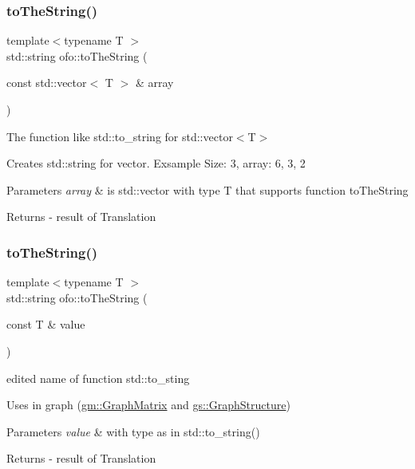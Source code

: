 \subsubsection{\texorpdfstring{to\+The\+String()}{toTheString()}\hspace{0.1cm}{\footnotesize\ttfamily [1/4]}}
{\footnotesize\ttfamily template$<$typename T $>$ \\
std\+::string ofo\+::to\+The\+String (\begin{DoxyParamCaption}\item[{const std\+::vector$<$ T $>$ \&}]{array }\end{DoxyParamCaption})}



The function like std\+::to\+\_\+string for std\+::vector$<$\+T$>$ 

Creates std\+::string for vector. Exsample Size\+: 3, array\+: 6, 3, 2 
\begin{DoxyParams}{Parameters}
{\em array} & is std\+::vector with type T that supports function to\+The\+String \\
\hline
\end{DoxyParams}
\begin{DoxyReturn}{Returns}
-\/ result of Translation 
\end{DoxyReturn}
\mbox{\label{namespaceofo_a2c6e4d8296036cbf1f27a0e785d203e1}} 
\subsubsection{\texorpdfstring{to\+The\+String()}{toTheString()}\hspace{0.1cm}{\footnotesize\ttfamily [2/4]}}
{\footnotesize\ttfamily template$<$typename T $>$ \\
std\+::string ofo\+::to\+The\+String (\begin{DoxyParamCaption}\item[{const T \&}]{value }\end{DoxyParamCaption})}



edited name of function std\+::to\+\_\+sting 

Uses in graph (\mbox{\hyperlink{classgm_1_1_graph_matrix}{gm\+::\+Graph\+Matrix}} and \mbox{\hyperlink{classgs_1_1_graph_structure}{gs\+::\+Graph\+Structure}}) 
\begin{DoxyParams}{Parameters}
{\em value} & with type as in std\+::to\+\_\+string() \\
\hline
\end{DoxyParams}
\begin{DoxyReturn}{Returns}
-\/ result of Translation 
\end{DoxyReturn}
\mbox{\label{namespaceofo_ac9cdba42766a85130c57eb07fd5bd5e5}} 
